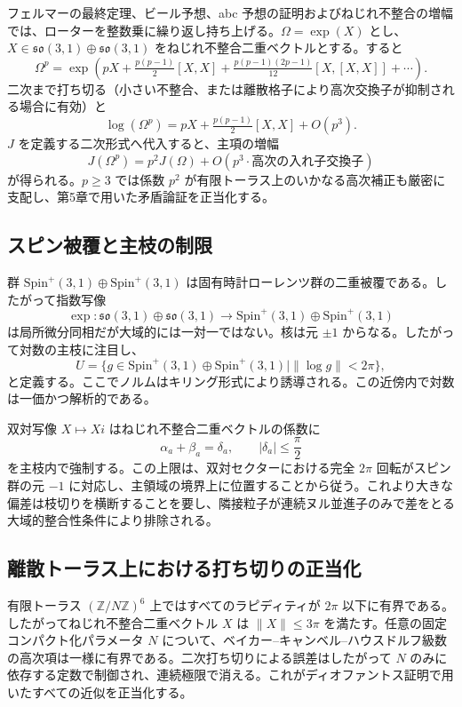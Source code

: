 \documentclass[dvipdfmx,a4paper]{article}
\theoremstyle{definition}
\theoremstyle{remark}
\begin{document}
フェルマーの最終定理、ビール予想、abc 予想の証明およびねじれ不整合の増幅では、ローターを整数乗に繰り返し持ち上げる。$\Omega = \exp(X)$ とし、$X \in \mathfrak{so}(3,1) \oplus \mathfrak{so}(3,1)$ をねじれ不整合二重ベクトルとする。すると
\[
\Omega^p = \exp(pX + \tfrac{p(p-1)}{2}[X,X] + \tfrac{p(p-1)(2p-1)}{12}[X,[X,X]] + \cdots).
\]
二次まで打ち切る（小さい不整合、または離散格子により高次交換子が抑制される場合に有効）と
\[
\log(\Omega^p) = pX + \tfrac{p(p-1)}{2}[X,X] + O(p^3).
\]
$J$ を定義する二次形式へ代入すると、主項の増幅
\[
J(\Omega^p) = p^2 J(\Omega) + O(p^3 \cdot \text{高次の入れ子交換子})
\]
が得られる。$p \geq 3$ では係数 $p^2$ が有限トーラス上のいかなる高次補正も厳密に支配し、第5章で用いた矛盾論証を正当化する。

\subsection{スピン被覆と主枝の制限}

群 $\mathrm{Spin}^+(3,1) \oplus \mathrm{Spin}^+(3,1)$ は固有時計ローレンツ群の二重被覆である。したがって指数写像
\[
\exp : \mathfrak{so}(3,1) \oplus \mathfrak{so}(3,1) \to \mathrm{Spin}^+(3,1) \oplus \mathrm{Spin}^+(3,1)
\]
は局所微分同相だが大域的には一対一ではない。核は元 $\pm 1$ からなる。したがって対数の主枝に注目し、
\[
U = \{ g \in \mathrm{Spin}^+(3,1) \oplus \mathrm{Spin}^+(3,1) \mid \| \log g \| < 2\pi \},
\]
と定義する。ここでノルムはキリング形式により誘導される。この近傍内で対数は一価かつ解析的である。

双対写像 $X \mapsto Xi$ はねじれ不整合二重ベクトルの係数に
\[
\alpha_a + \beta_a = \delta_a, \qquad |\delta_a| \leq \frac{\pi}{2}
\]
を主枝内で強制する。この上限は、双対セクターにおける完全 $2\pi$ 回転がスピン群の元 $-1$ に対応し、主領域の境界上に位置することから従う。これより大きな偏差は枝切りを横断することを要し、隣接粒子が連続ヌル並進子のみで差をとる大域的整合性条件により排除される。

\subsection{離散トーラス上における打ち切りの正当化}

有限トーラス $(\mathbb{Z}/N\mathbb{Z})^6$ 上ではすべてのラピディティが $2\pi$ 以下に有界である。したがってねじれ不整合二重ベクトル $X$ は $\|X\| \leq 3\pi$ を満たす。任意の固定コンパクト化パラメータ $N$ について、ベイカー--キャンベル--ハウスドルフ級数の高次項は一様に有界である。二次打ち切りによる誤差はしたがって $N$ のみに依存する定数で制御され、連続極限で消える。これがディオファントス証明で用いたすべての近似を正当化する。
\end{document}
